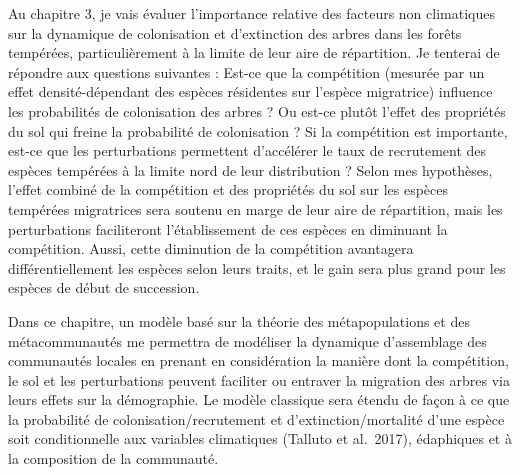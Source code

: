 Au chapitre 3, je vais évaluer l'importance relative des facteurs non
climatiques sur la dynamique de colonisation et d'extinction des arbres
dans les forêts tempérées, particulièrement à la limite de leur aire de
répartition. Je tenterai de répondre aux questions suivantes : Est-ce
que la compétition (mesurée par un effet densité-dépendant des espèces
résidentes sur l'espèce migratrice) influence les probabilités de
colonisation des arbres ? Ou est-ce plutôt l'effet des propriétés du sol
qui freine la probabilité de colonisation ? Si la compétition est
importante, est-ce que les perturbations permettent d'accélérer le taux
de recrutement des espèces tempérées à la limite nord de leur
distribution ? Selon mes hypothèses, l'effet combiné de la compétition
et des propriétés du sol sur les espèces tempérées migratrices sera
soutenu en marge de leur aire de répartition, mais les perturbations
faciliteront l'établissement de ces espèces en diminuant la compétition.
Aussi, cette diminution de la compétition avantagera différentiellement
les espèces selon leurs traits, et le gain sera plus grand pour les
espèces de début de succession.

Dans ce chapitre, un modèle basé sur la théorie des métapopulations et
des métacommunautés me permettra de modéliser la dynamique d'assemblage
des communautés locales en prenant en considération la manière dont la
compétition, le sol et les perturbations peuvent faciliter ou entraver
la migration des arbres via leurs effets sur la démographie. Le modèle
classique sera étendu de façon à ce que la probabilité de
colonisation/recrutement et d'extinction/mortalité d'une espèce soit
conditionnelle aux variables climatiques (Talluto et al.~2017),
édaphiques et à la composition de la communauté.

\endinput
